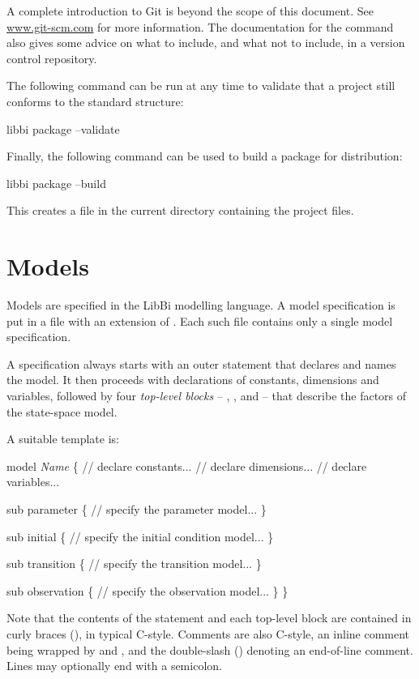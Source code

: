 A complete introduction to Git is beyond the scope of this document. See
\href{http://www.git-scm.com}{www.git-scm.com} for more information. The
documentation for the  command also gives some advice on
what to include, and what not to include, in a version control repository.

The following command can be run at any time to validate that a project still
conforms to the standard structure:
\begin{cmdcode}
libbi package --validate
\end{cmdcode}

Finally, the following command can be used to build a package for
distribution:
\begin{cmdcode}
libbi package --build
\end{cmdcode}
This creates a  file in the current directory containing the
project files.

\section{Models\label{Models}}

Models are specified in the LibBi modelling language. A model specification is
put in a file with an extension of . Each such file contains only a
single model specification.

A specification always starts with an outer  statement that
declares and names the model. It then proceeds with declarations of constants,
dimensions and variables, followed by four \emph{top-level blocks} --
, ,  and
 -- that describe the factors of the state-space model.

A suitable template is:
\begin{bicode}
model \textsl{Name} \{
  // declare constants...
  // declare dimensions...
  // declare variables...

  sub parameter \{
    // specify the parameter model...
  \}

  sub initial \{
    // specify the initial condition model...
  \}

  sub transition \{
    // specify the transition model...
  \}

  sub observation \{
    // specify the observation model...
  \}
\}
\end{bicode}

Note that the contents of the  statement and each top-level block
are contained in curly braces (\bitt{\{\(\ldots\)\}}), in typical
C-style. Comments are also C-style, an inline comment being wrapped by
\bitt{/*} and \bitt{*/}, and the double-slash (\bitt{//}) denoting an
end-of-line comment. Lines may optionally end with a semicolon.

